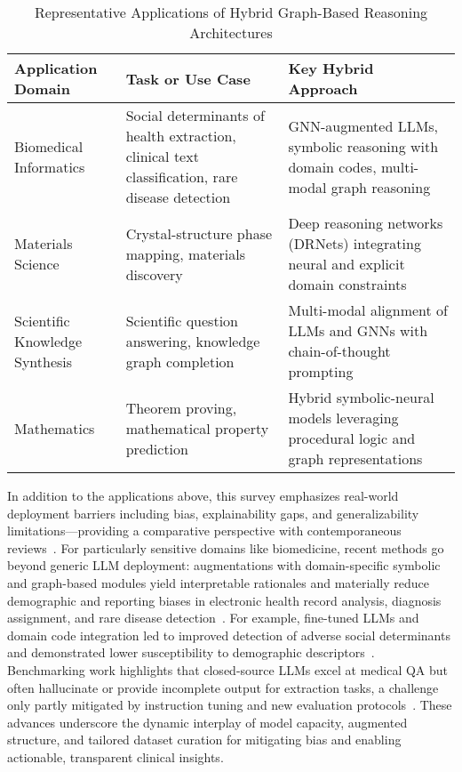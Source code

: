 \documentclass[sigconf]{acmart}
\begin{document}
\begin{table*}[htbp]
\centering
\caption{Representative Applications of Hybrid Graph-Based Reasoning Architectures}
\label{tab:domain_applications}
\begin{adjustbox}{max width=\textwidth}
\begin{tabular}{lll}
\toprule
\textbf{Application Domain} & \textbf{Task or Use Case} & \textbf{Key Hybrid Approach} \\
\midrule
Biomedical Informatics & Social determinants of health extraction, clinical text classification, rare disease detection & GNN-augmented LLMs, symbolic reasoning with domain codes, multi-modal graph reasoning \\
Materials Science & Crystal-structure phase mapping, materials discovery & Deep reasoning networks (DRNets) integrating neural and explicit domain constraints \\
Scientific Knowledge Synthesis & Scientific question answering, knowledge graph completion & Multi-modal alignment of LLMs and GNNs with chain-of-thought prompting \\
Mathematics & Theorem proving, mathematical property prediction & Hybrid symbolic-neural models leveraging procedural logic and graph representations \\
\bottomrule
\end{tabular}
\end{adjustbox}
\end{table*}

In addition to the applications above, this survey emphasizes real-world deployment barriers including bias, explainability gaps, and generalizability limitations—providing a comparative perspective with contemporaneous reviews~\cite{ref49,ref50,ref53,ref55,ref94,ref95}. For particularly sensitive domains like biomedicine, recent methods go beyond generic LLM deployment: augmentations with domain-specific symbolic and graph-based modules yield interpretable rationales and materially reduce demographic and reporting biases in electronic health record analysis, diagnosis assignment, and rare disease detection~\cite{ref1,ref2,ref3,ref4,ref5,ref15,ref18,ref19,ref36,ref43,ref45,ref47,ref49,ref50,ref53,ref55,ref61,ref62,ref89,ref94,ref95}. For example, fine-tuned LLMs and domain code integration led to improved detection of adverse social determinants and demonstrated lower susceptibility to demographic descriptors~\cite{ref2,ref53}. Benchmarking work highlights that closed-source LLMs excel at medical QA but often hallucinate or provide incomplete output for extraction tasks, a challenge only partly mitigated by instruction tuning and new evaluation protocols~\cite{ref94,ref95}. These advances underscore the dynamic interplay of model capacity, augmented structure, and tailored dataset curation for mitigating bias and enabling actionable, transparent clinical insights.
\end{document}
